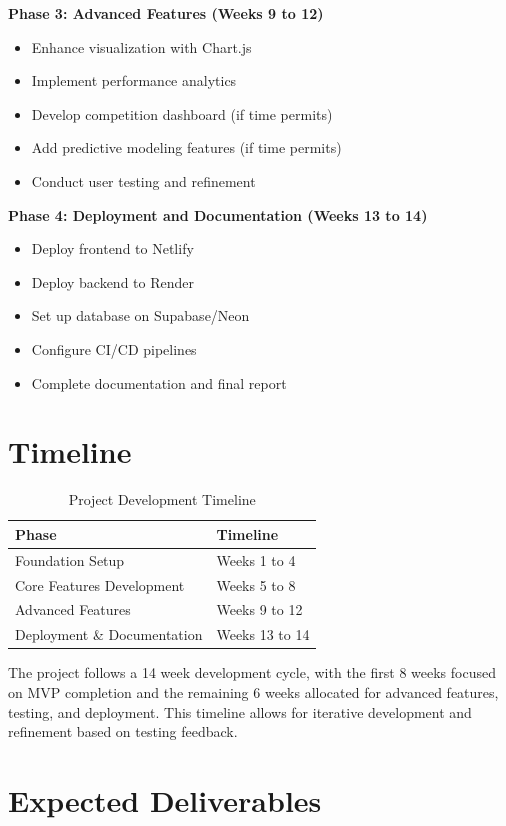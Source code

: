 \documentclass[11pt, oneside]{article}   	%
\begin{document}
\textbf{Phase 3: Advanced Features (Weeks 9 to 12)}
\begin{itemize}
    \item Enhance visualization with Chart.js
    \item Implement performance analytics
    \item Develop competition dashboard (if time permits)
    \item Add predictive modeling features (if time permits)
    \item Conduct user testing and refinement
\end{itemize}

\textbf{Phase 4: Deployment and Documentation (Weeks 13 to 14)}
\begin{itemize}
    \item Deploy frontend to Netlify
    \item Deploy backend to Render
    \item Set up database on Supabase/Neon
    \item Configure CI/CD pipelines
    \item Complete documentation and final report
\end{itemize}

\section*{Timeline}

\begin{table}[h]
\centering
\begin{tabular}{|l|l|}
\hline
\textbf{Phase} & \textbf{Timeline} \\
\hline
Foundation Setup & Weeks 1 to 4 \\
Core Features Development & Weeks 5 to 8 \\
Advanced Features & Weeks 9 to 12 \\
Deployment \& Documentation & Weeks 13 to 14 \\
\hline
\end{tabular}
\caption{Project Development Timeline}
\end{table}

The project follows a 14 week development cycle, with the first 8 weeks focused on MVP completion and the remaining 6 weeks allocated for advanced features, testing, and deployment. This timeline allows for iterative development and refinement based on testing feedback.

\section*{Expected Deliverables}
\end{document}
